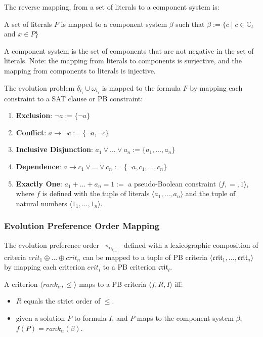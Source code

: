 The reverse mapping, from a set of literals to a component system is:
\begin{defs}
A set of literals $P$ is mapped to a component system $\beta$ such that $\beta := \{c \mid c \in \mathbb{C}_t$ and $x \in P\}$
\end{defs}
A component system is the set of components that are not negative in the set of literals.  
Note: the mapping from literals to components is surjective, and the mapping from components to literals is injective.


The evolution problem $\delta_{t_i} \cup \omega_{t_i}$ is mapped to the formula $F$
by mapping each constraint to a SAT clause or PB constraint:
\begin{enumerate}
  \item \textbf{Exclusion}: $\neg a := \{\neg a\}$
  \item \textbf{Conflict}: $a \rightarrow \neg c := \{\neg a, \neg c\}$ 
  \item \textbf{Inclusive Disjunction}: $a_1 \vee \ldots \vee a_n := \{a_1, \ldots,  a_n\}$ 
  \item \textbf{Dependence}: $a \rightarrow c_1 \vee \ldots \vee c_n := \{\neg a, c_1, \ldots, c_n\}$
  \item \textbf{Exactly One}: $a_1 + \ldots + a_n = 1 := $ a pseudo-Boolean constraint $\langle f,=, 1 \rangle$, 
  where $f$ is defined with the tuple of literals $\langle a_1 ,\ldots , a_n\rangle$ and the tuple of natural numbers $\langle 1_1,\ldots,1_n \rangle$.
\end{enumerate}


\subsubsection{Evolution Preference Order Mapping}
The evolution preference order $\prec_{\alpha_{t_{i-1}}}$ defined with a lexicographic composition of criteria $crit_{1} \oplus \ldots \oplus crit_{n}$ 
can be mapped to a tuple of PB criteria $\langle \mathfrak{crit}_1,\ldots,\mathfrak{crit}_n\rangle$
by mapping each criterion $crit_{i}$ to a PB criterion $\mathfrak{crit}_i$.

A criterion $\langle rank_{\alpha} ,\leq \rangle$ maps to a PB criteria $\langle f, R , I \rangle$ iff:
\begin{itemize}
  \item $R$ equals the strict order of $\leq$.
  \item given a solution $P$ to formula $I$, and $P$ maps to the component system $\beta$, $f(P) = rank_{\alpha}(\beta)$. 
\end{itemize} 

